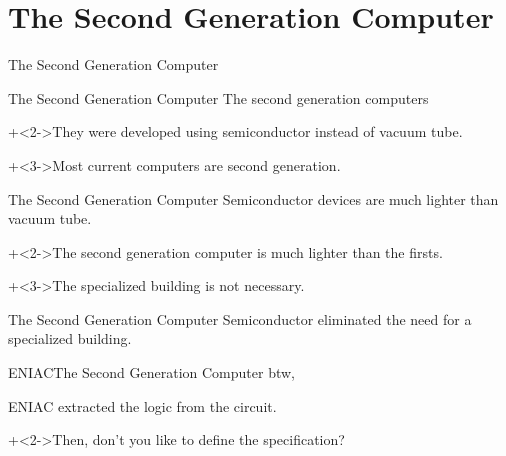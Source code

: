 %
%

\section{The Second Generation Computer}


\begin{frame}{}{}
    {\Large The Second Generation Computer}
\end{frame}


\begin{frame}{The Second Generation Computer}{}
    The second generation computers
    \vspace{2ex}

    \onslide+<2->{They were developed using semiconductor instead of vacuum tube.}
    \vspace{4ex}

    \onslide+<3->{Most current computers are second generation.}
\end{frame}


\begin{frame}{The Second Generation Computer}{}
    Semiconductor devices are much lighter than vacuum tube.
    \vspace{4ex}

    \onslide+<2->{The second generation computer is much lighter than the firsts.}
    \vspace{4ex}

    \onslide+<3->{The specialized building is not necessary.}
\end{frame}


\begin{frame}{The Second Generation Computer}{}
    Semiconductor eliminated the need for a specialized building.
\end{frame}


\begin{frame}{ENIAC}{The Second Generation Computer}
    btw,
    \vspace{2ex}

    ENIAC extracted the logic from the circuit.
    \vspace{4ex}

    \onslide+<2->{Then, don't you like to define the specification?}
\end{frame}


